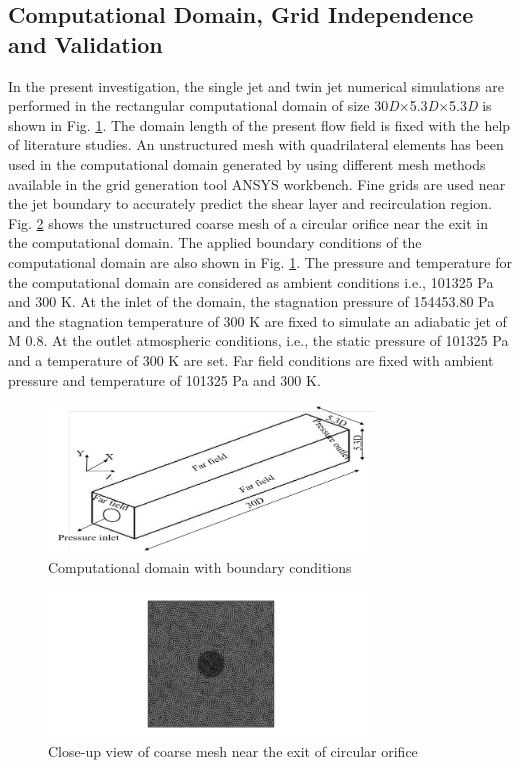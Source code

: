 \documentclass[Afour,sagev,times]{sagej}
\begin{document}
\subsection{Computational Domain, Grid Independence and Validation}
In the present investigation, the single jet and twin jet numerical simulations are performed in the rectangular computational domain of size  30\textit{D}$\mathrm{\times}$5.3\textit{D}$\mathrm{\times}$5.3\textit{D }is shown in Fig. \ref{fig:domain}. The domain length of the present flow field is fixed with the help of literature \cite{anderson2001experimental,mosavati2021characteristics,valencia2021analysis} studies. An unstructured mesh with quadrilateral elements has been used in the computational domain generated by using different mesh methods available in the grid generation tool ANSYS workbench. Fine grids are used near the jet boundary to accurately predict the shear layer and recirculation region. Fig. \ref{fig:mesh} shows the unstructured coarse mesh of a circular orifice near the exit in the computational domain. The applied boundary conditions of the computational domain are also shown in Fig. \ref{fig:domain}. %
The pressure and temperature for the computational domain are considered as ambient conditions i.e., 101325 Pa and 300 K. At the inlet of the domain, the stagnation pressure of 154453.80 Pa and the stagnation temperature of 300 K are fixed to simulate an adiabatic jet of M 0.8. At the outlet atmospheric conditions, i.e., the static pressure of 101325 Pa and a temperature of 300 K are set. Far field conditions are fixed with ambient pressure and temperature of 101325 Pa and 300 K.
\begin{figure}[h]
\centering
\includegraphics[width=3.4in]{domain.png}
\caption{Computational domain with boundary conditions}
\label{fig:domain}
\end{figure}
\begin{figure}[h]
\centering
\includegraphics[width=3.4in]{mesh view.png}
\caption{Close-up view of coarse mesh near the exit of circular orifice}
\label{fig:mesh}
\end{figure}
\end{document}
